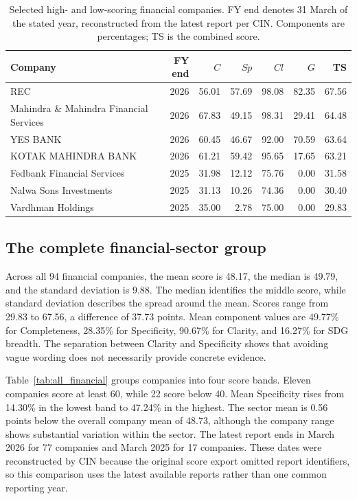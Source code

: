 \begin{table}[H]
\centering\small
\caption{Selected high- and low-scoring financial companies. FY end denotes 31 March of the stated year, reconstructed from the latest report per CIN. Components are percentages; TS is the combined score.}
\label{tab:financial_selected}
\begin{tabularx}{\linewidth}{@{}Yrrrrrr@{}}
\toprule\textbf{Company} & \textbf{FY end} & \textbf{$C$} & \textbf{$Sp$} & \textbf{$Cl$} & \textbf{$G$} & \textbf{TS}\\\midrule
REC & 2026 & 56.01 & 57.69 & 98.08 & 82.35 & 67.56 \\
Mahindra \& Mahindra Financial Services & 2026 & 67.83 & 49.15 & 98.31 & 29.41 & 64.48 \\
YES BANK & 2026 & 60.45 & 46.67 & 92.00 & 70.59 & 63.64 \\
KOTAK MAHINDRA BANK & 2026 & 61.21 & 59.42 & 95.65 & 17.65 & 63.21 \\
Fedbank Financial Services & 2025 & 31.98 & 12.12 & 75.76 & 0.00 & 31.58 \\
Nalwa Sons Investments & 2025 & 31.13 & 10.26 & 74.36 & 0.00 & 30.40 \\
Vardhman Holdings & 2025 & 35.00 & 2.78 & 75.00 & 0.00 & 29.83 \\
\bottomrule
\end{tabularx}
\end{table}

\subsection{The complete financial-sector group}
\label{sec:all_finance}

Across all 94 financial companies, the mean score is 48.17, the median is 49.79, and the standard deviation is 9.88. The median identifies the middle score, while standard deviation describes the spread around the mean. Scores range from 29.83 to 67.56, a difference of 37.73 points. Mean component values are 49.77\% for Completeness, 28.35\% for Specificity, 90.67\% for Clarity, and 16.27\% for SDG breadth. The separation between Clarity and Specificity shows that avoiding vague wording does not necessarily provide concrete evidence.

Table~\ref{tab:all_financial} groups companies into four score bands. Eleven companies score at least 60, while 22 score below 40. Mean Specificity rises from 14.30\% in the lowest band to 47.24\% in the highest. The sector mean is 0.56 points below the overall company mean of 48.73, although the company range shows substantial variation within the sector. The latest report ends in March 2026 for 77 companies and March 2025 for 17 companies. These dates were reconstructed by CIN because the original score export omitted report identifiers, so this comparison uses the latest available reports rather than one common reporting year.

